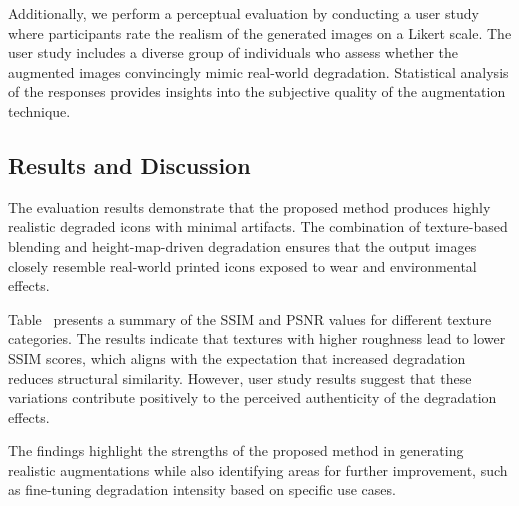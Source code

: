 Additionally, we perform a perceptual evaluation by conducting a user study where participants rate the realism of the generated images on a Likert scale. The user study includes a diverse group of individuals who assess whether the augmented images convincingly mimic real-world degradation. Statistical analysis of the responses provides insights into the subjective quality of the augmentation technique.

\subsection{Results and Discussion}

The evaluation results demonstrate that the proposed method produces highly realistic degraded icons with minimal artifacts. The combination of texture-based blending and height-map-driven degradation ensures that the output images closely resemble real-world printed icons exposed to wear and environmental effects.

Table~ presents a summary of the SSIM and PSNR values for different texture categories. The results indicate that textures with higher roughness lead to lower SSIM scores, which aligns with the expectation that increased degradation reduces structural similarity. However, user study results suggest that these variations contribute positively to the perceived authenticity of the degradation effects.

The findings highlight the strengths of the proposed method in generating realistic augmentations while also identifying areas for further improvement, such as fine-tuning degradation intensity based on specific use cases.
